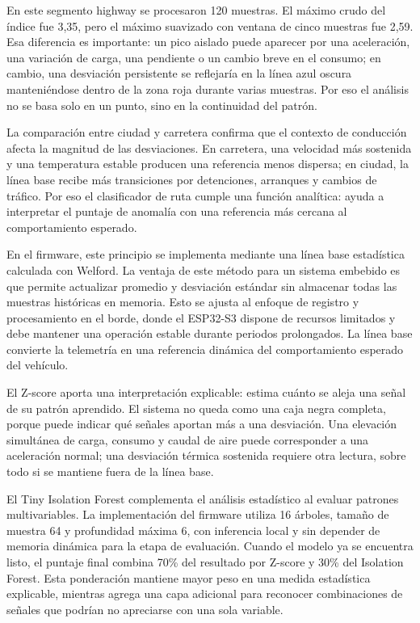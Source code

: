 \documentclass[12pt,letterpaper]{report}
\begin{document}
En este segmento highway se procesaron 120 muestras. El máximo crudo del índice fue 3,35, pero el máximo suavizado con ventana de cinco muestras fue 2,59. Esa diferencia es importante: un pico aislado puede aparecer por una aceleración, una variación de carga, una pendiente o un cambio breve en el consumo; en cambio, una desviación persistente se reflejaría en la línea azul oscura manteniéndose dentro de la zona roja durante varias muestras. Por eso el análisis no se basa solo en un punto, sino en la continuidad del patrón.

La comparación entre ciudad y carretera confirma que el contexto de conducción afecta la magnitud de las desviaciones. En carretera, una velocidad más sostenida y una temperatura estable producen una referencia menos dispersa; en ciudad, la línea base recibe más transiciones por detenciones, arranques y cambios de tráfico. Por eso el clasificador de ruta cumple una función analítica: ayuda a interpretar el puntaje de anomalía con una referencia más cercana al comportamiento esperado.

En el firmware, este principio se implementa mediante una línea base estadística calculada con Welford. La ventaja de este método para un sistema embebido es que permite actualizar promedio y desviación estándar sin almacenar todas las muestras históricas en memoria. Esto se ajusta al enfoque de registro y procesamiento en el borde, donde el ESP32-S3 dispone de recursos limitados y debe mantener una operación estable durante periodos prolongados. La línea base convierte la telemetría en una referencia dinámica del comportamiento esperado del vehículo.

El Z-score aporta una interpretación explicable: estima cuánto se aleja una señal de su patrón aprendido. El sistema no queda como una caja negra completa, porque puede indicar qué señales aportan más a una desviación. Una elevación simultánea de carga, consumo y caudal de aire puede corresponder a una aceleración normal; una desviación térmica sostenida requiere otra lectura, sobre todo si se mantiene fuera de la línea base.

El Tiny Isolation Forest complementa el análisis estadístico al evaluar patrones multivariables. La implementación del firmware utiliza 16 árboles, tamaño de muestra 64 y profundidad máxima 6, con inferencia local y sin depender de memoria dinámica para la etapa de evaluación. Cuando el modelo ya se encuentra listo, el puntaje final combina 70\% del resultado por Z-score y 30\% del Isolation Forest. Esta ponderación mantiene mayor peso en una medida estadística explicable, mientras agrega una capa adicional para reconocer combinaciones de señales que podrían no apreciarse con una sola variable.
\end{document}
